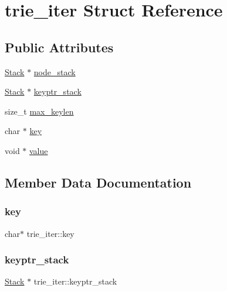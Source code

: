 \hypertarget{structtrie__iter}{}\section{trie\+\_\+iter Struct Reference}
\label{structtrie__iter}
\subsection*{Public Attributes}
\begin{DoxyCompactItemize}
\item 
\mbox{\hyperlink{stack_8c_a2ef239a3a7982dbfb73694e0d427bae7}{Stack}} $\ast$ \mbox{\hyperlink{structtrie__iter_a64c95d56b672bb241db8e24c438e6f07}{node\+\_\+stack}}
\item 
\mbox{\hyperlink{stack_8c_a2ef239a3a7982dbfb73694e0d427bae7}{Stack}} $\ast$ \mbox{\hyperlink{structtrie__iter_a8b8603e4a20fd83104e53a3735075826}{keyptr\+\_\+stack}}
\item 
size\+\_\+t \mbox{\hyperlink{structtrie__iter_add40401793ab6e342863b7747af165d1}{max\+\_\+keylen}}
\item 
char $\ast$ \mbox{\hyperlink{structtrie__iter_aec2838a9ba97957bb00a17e1dde0061a}{key}}
\item 
void $\ast$ \mbox{\hyperlink{structtrie__iter_a6b9dbd03ea4c0c5e909ab8608633fe1b}{value}}
\end{DoxyCompactItemize}


\subsection{Member Data Documentation}
\mbox{\label{structtrie__iter_aec2838a9ba97957bb00a17e1dde0061a}} 
\subsubsection{\texorpdfstring{key}{key}}
{\footnotesize\ttfamily char$\ast$ trie\+\_\+iter\+::key}

\mbox{\label{structtrie__iter_a8b8603e4a20fd83104e53a3735075826}} 
\subsubsection{\texorpdfstring{keyptr\_stack}{keyptr\_stack}}
{\footnotesize\ttfamily \mbox{\hyperlink{stack_8c_a2ef239a3a7982dbfb73694e0d427bae7}{Stack}} $\ast$ trie\+\_\+iter\+::keyptr\+\_\+stack}

